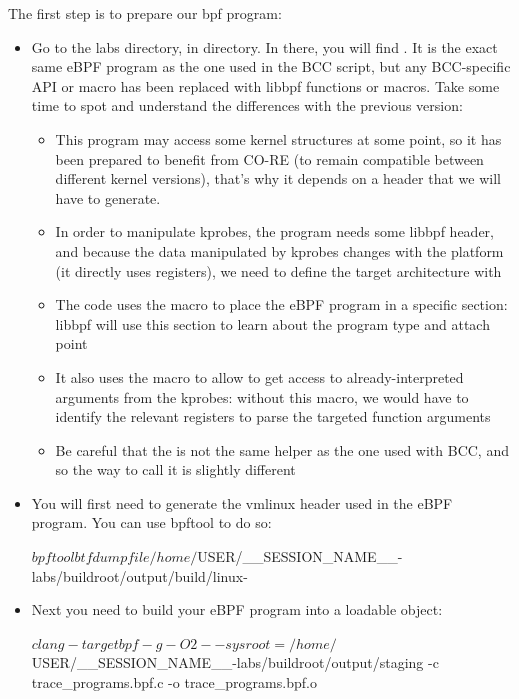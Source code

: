 The first step is to prepare our bpf program:
\begin{itemize}
  \item Go to the labs directory, in  directory. In there, you will find . It is the exact same eBPF program as the one used in the BCC script, but any BCC-specific API or macro has been replaced with libbpf functions or macros. Take some time to spot and understand the differences with the previous version:
    \begin{itemize}
      \item This program may access some kernel structures at some point, so it has been prepared to benefit from CO-RE (to remain compatible between different kernel versions), that's why it depends on a  header that we will have to generate.
      \item In order to manipulate kprobes, the program needs some libbpf header, and because the data manipulated by kprobes changes with the platform (it directly uses registers), we need to define the target architecture with
      \item The code uses the  macro to place the eBPF program in a specific section: libbpf will use this section to learn about the program type and attach point
      \item It also uses the  macro to allow to get access to already-interpreted arguments from the kprobes: without this macro, we would have to identify the relevant registers to parse the targeted function arguments
      \item Be careful that the  is not the same helper as the one used with BCC, and so the way to call it is slightly different
    \end{itemize}
  \item You will first need to generate the vmlinux header used in the eBPF program. You can use bpftool to do so:
  \begin{bashinput}
$ bpftool btf dump file /home/${USER}/__SESSION_NAME__-labs/buildroot/output/build/linux-%
  \end{bashinput}
  \item Next you need to build your eBPF program into a loadable object:
  \begin{bashinput}
$ clang -target bpf -g -O2 --sysroot=/home/${USER}/__SESSION_NAME__-labs/buildroot/output/staging -c trace_programs.bpf.c -o trace_programs.bpf.o
  \end{bashinput}


\end{itemize}
